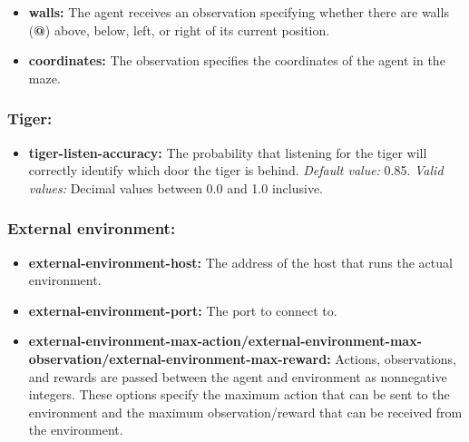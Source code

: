 \documentclass[a4paper,11pt]{article}
\begin{document}
\begin{itemize}
\begin{itemize}
  \item {\bf walls:} The agent receives an observation specifying whether there are walls ({\bf @}) above, below, left, or right of its current position.

  \item {\bf coordinates:} The observation specifies the coordinates of the agent in the maze.
  \end{itemize}
\end{itemize}



\subsubsection{Tiger:}
\begin{itemize}
\item {\bf tiger-listen-accuracy:} The probability that listening for the tiger will correctly identify which door the tiger is behind. {\em Default value:} 0.85. {\em Valid values:} Decimal values between 0.0 and 1.0 inclusive.
\end{itemize}


\subsubsection{External environment:}
\begin{itemize}
\item {\bf external-environment-host:} The address of the host that runs the actual environment.
\item {\bf external-environment-port:} The port to connect to.
\item {\bf external-environment-max-action/external-environment-max-observation/external-environment-max-reward:} Actions, observations, and rewards are passed between the agent and environment as nonnegative integers. These options specify the maximum action that can be sent to the environment and the maximum observation/reward that can be received from the environment.
\end{itemize}
\end{document}
